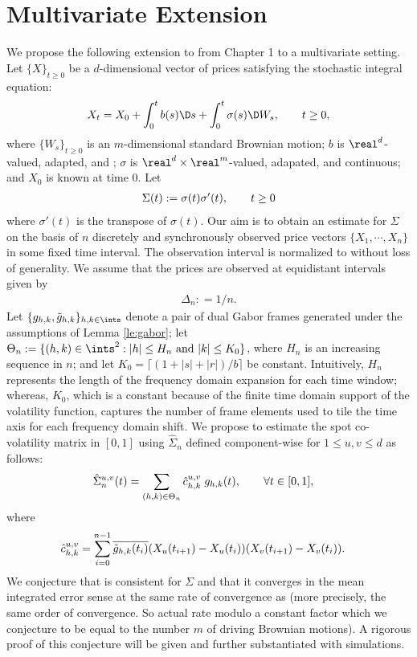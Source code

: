\section{Multivariate Extension} \label{sec:extension}
We propose the following extension to \svn from Chapter 1 to a multivariate setting. Let $\{X\}_{t \ge 0}$ be a $d$-dimensional vector of prices satisfying the stochastic integral equation:
\begin{align}
  X_t = X_0 + \int^t_0 b(s) \D s + \int^t_0 \sigma(s) \D W_s, \qquad  t \ge 0,\notag
  \label{}
\end{align}
where $\{W_s\}_{t \ge 0}$ is an $m$-dimensional standard Brownian motion; $b$ is  $\real^d$-valued, adapted, and \cadlag; $\sigma$ is $\real^d \times \real^m$-valued, adapated, and continuous; and $X_0$ is known at time 0. Let 
\begin{align}
  \Sigma (t) := \sigma(t)\sigma'(t), \qquad t \ge  0\notag
  \label{}
\end{align}
where $\sigma'(t)$ is the transpose of $\sigma(t)$. Our aim is to obtain an estimate for $\Sigma$ on the basis of $n$ discretely and synchronously  observed price vectors $\{X_1,\cdots,X_n\}$ in some fixed time interval. The observation interval is normalized to \domain without loss of generality. We assume that the prices are observed at equidistant intervals given by 
\begin{align}
\Delta_n : = 1/n.
\end{align}
Let $\{g_{h,k}, \tghk\}_{h,k \in \ints}$ denote  a pair of dual Gabor frames generated under the assumptions of  Lemma \eqref{le:gabor}; let  $\Theta_n := \{(h,k) \in \ints^2 : |h| \le H_n \text{ and }|k| \le K_0\}$, where $H_n$ is  an increasing sequence in  $n$;  and let $K_0= \lceil (1 + |s| + |r|)/b \rceil$ be constant. Intuitively,  $H_n$ represents the length of the frequency domain expansion for each time window; whereas, $K_0$, which is a constant because of the finite time domain support of the volatility function, captures the number of frame elements used to tile the time axis for each frequency domain shift.    
We propose to estimate the spot co-volatility matrix in $[0,1]$ using $\hat{\Sigma}_n$ defined component-wise for $1 \le u,v \le d$ as follows:
\begin{align}
  &\hat{\Sigma}_n^{u,v}(t) = \sum_{(h,k) \in \Theta_n} \hat{c}_{h,k}^{u,v}\;g_{h,k}(t),\qquad \forall t \in [0,1],  \label{eq:Sigma}
\end{align}
where 
\begin{align}
  &\hat{c}_{h,k}^{u,v} = \sum_{i =0}^{n-1} \overline{\tilde{g}_{h,k}(t_i)} (X_u(t_{i+1}) - X_u(t_i))(X_v(t_{i+1}) - X_v(t_i)).
  \label{}
\end{align}
We conjecture that \Svn is consistent for $\Sigma$ and that it converges in the mean integrated error sense at the same rate of convergence as \svn (more precisely, the same order of convergence. So actual rate modulo a constant factor which we conjecture to be equal to the number $m$ of driving Brownian motions). A rigorous proof of this conjecture will be given and further substantiated with simulations.
